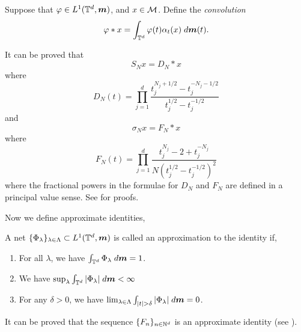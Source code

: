 \begin{definition}
    Suppose that $\varphi \in L^1(\mathbb{T}^d,\boldsymbol{m})$, and $x \in \mathcal{M}$. Define the \emph{convolution}
    \begin{equation}
        \varphi * x = \int_{\mathbb{T}^d} \varphi(t)\alpha_t(x)\;d\boldsymbol{m}(t).
    \end{equation}
\end{definition}

It can be proved that
\begin{equation}
    S_N x = D_N * x
\end{equation}
where 
\begin{equation}
    D_N(t) = \prod_{j=1}^d\frac{t_j^{N_j+1/2}-t_j^{-N_j-1/2}}{t_j^{1/2}-t_j^{-1/2}}
\end{equation}
and
\begin{equation}
    \sigma_N x = F_N*x
\end{equation}
where
\begin{equation}
    F_N(t) = \prod_{j=1}^d\frac{t_j^{N_j}-2+t_j^{-N_j}}{N(t_j^{1/2}-t_j^{-1/2})^2}
\end{equation}
where the fractional powers in the formulae for $D_N$ and $F_N$ are defined
in a principal value sense. See \cite{me} for proofs.

Now we define approximate identities,
\begin{definition}
    A net $\{\Phi_\lambda\}_{\lambda \in \Lambda} \subset L^1(\mathbb{T}^d,\boldsymbol{m})$ is called
    an approximation to the identity if,
    \begin{enumerate}
        \item{} For all $\lambda$, we have $\int_{\mathbb{T}^d} \Phi_\lambda \;d\boldsymbol{m} = 1$.
        \item{} We have $\sup_{\lambda} \int_{\mathbb{T}^d} |\Phi_\lambda|\;d\boldsymbol{m} < \infty$
        \item{} For any $\delta > 0$, we have $\lim_{\lambda \in \Lambda} \int_{|t| > \delta} |\Phi_\lambda|\;d\boldsymbol{m} = 0$.
    \end{enumerate}
\end{definition}

It can be proved that the sequence $\{F_n\}_{n\in\mathbb{N}^d}$ is an approximate
identity (see \cite{me}).

